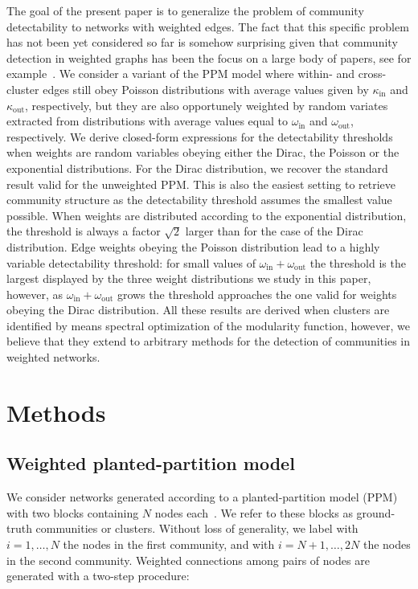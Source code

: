 \documentclass[a4paper,pre,superscriptaddress,floatfix,nofootinbib,twocolumn]{revtex4-1}
\begin{document}
The goal of the present paper is to generalize the problem of community detectability to networks with weighted edges.
The fact that this specific problem has not been yet considered so far is somehow surprising given that community detection
in weighted graphs has been the focus on a large body of papers, see for example~\cite{Ref}.
We consider a variant of the PPM model where within- and cross-cluster edges still obey
Poisson distributions with average values given by $\kappa_\text{in}$ and $\kappa_\text{out}$, respectively, but they
are also opportunely weighted by random variates extracted from distributions with average values equal to $\omega_\text{in}$ and $\omega_\text{out}$, respectively. We derive closed-form expressions for the detectability thresholds when weights are random variables obeying either the Dirac, the Poisson
or the exponential distributions. For the Dirac distribution, we recover the standard result valid for the unweighted PPM. This is also the easiest setting to retrieve community structure as the detectability threshold assumes the smallest value possible. When weights are distributed according to the exponential distribution, the threshold is always a factor $\sqrt{2}$ larger than for the case of the Dirac distribution. Edge weights obeying the Poisson distribution lead to a highly variable detectability threshold: for small values of  $\omega_\text{in} + \omega_\text{out}$ the threshold is the largest displayed by the three weight distributions we study in this paper, however, as  $\omega_\text{in} + \omega_\text{out}$ grows the threshold approaches the one valid for weights obeying the Dirac distribution. All these results are derived when
clusters are identified by means spectral optimization of the modularity function, however, we believe that they extend to
arbitrary methods for the detection of communities in weighted networks.



\section*{Methods}

\subsection*{Weighted planted-partition model}

We consider networks generated according to a planted-partition model (PPM) with two blocks containing $N$ nodes each~\cite{condon2001algorithms}. We refer to these blocks as ground-truth communities or clusters. Without loss of generality, we label with $i=1, \ldots, N$ the nodes in the first community, and with $i=N+1, \ldots, 2N$ the nodes in the second community.  Weighted connections among pairs of nodes are generated with a two-step procedure:
\end{document}
